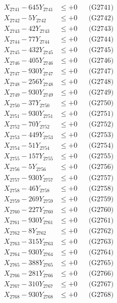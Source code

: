 \documentclass[a4paper,10pt]{article}
\begin{document}
{\begin{align}
\allowbreak
X_{2741} - 645Y_{2741} &\leq +0 && \text{(G2741)} \\
X_{2742} - 5Y_{2742} &\leq +0 && \text{(G2742)} \\
X_{2743} - 42Y_{2743} &\leq +0 && \text{(G2743)} \\
X_{2744} - 77Y_{2744} &\leq +0 && \text{(G2744)} \\
X_{2745} - 432Y_{2745} &\leq +0 && \text{(G2745)} \\
X_{2746} - 405Y_{2746} &\leq +0 && \text{(G2746)} \\
X_{2747} - 930Y_{2747} &\leq +0 && \text{(G2747)} \\
X_{2748} - 256Y_{2748} &\leq +0 && \text{(G2748)} \\
X_{2749} - 930Y_{2749} &\leq +0 && \text{(G2749)} \\
X_{2750} - 37Y_{2750} &\leq +0 && \text{(G2750)} \\
\allowbreak
X_{2751} - 930Y_{2751} &\leq +0 && \text{(G2751)} \\
X_{2752} - 70Y_{2752} &\leq +0 && \text{(G2752)} \\
X_{2753} - 449Y_{2753} &\leq +0 && \text{(G2753)} \\
X_{2754} - 51Y_{2754} &\leq +0 && \text{(G2754)} \\
X_{2755} - 157Y_{2755} &\leq +0 && \text{(G2755)} \\
X_{2756} - 5Y_{2756} &\leq +0 && \text{(G2756)} \\
X_{2757} - 930Y_{2757} &\leq +0 && \text{(G2757)} \\
X_{2758} - 46Y_{2758} &\leq +0 && \text{(G2758)} \\
X_{2759} - 269Y_{2759} &\leq +0 && \text{(G2759)} \\
X_{2760} - 227Y_{2760} &\leq +0 && \text{(G2760)} \\
\allowbreak
X_{2761} - 930Y_{2761} &\leq +0 && \text{(G2761)} \\
X_{2762} - 8Y_{2762} &\leq +0 && \text{(G2762)} \\
X_{2763} - 315Y_{2763} &\leq +0 && \text{(G2763)} \\
X_{2764} - 930Y_{2764} &\leq +0 && \text{(G2764)} \\
X_{2765} - 388Y_{2765} &\leq +0 && \text{(G2765)} \\
X_{2766} - 281Y_{2766} &\leq +0 && \text{(G2766)} \\
X_{2767} - 310Y_{2767} &\leq +0 && \text{(G2767)} \\
X_{2768} - 930Y_{2768} &\leq +0 && \text{(G2768)} \\

\end{align}}
\end{document}
